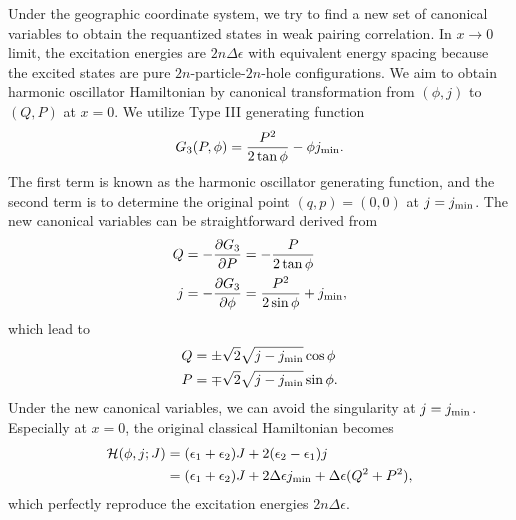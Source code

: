 \documentclass[11pt]{book} %
\begin{document}
Under the geographic coordinate system, we try to find a new set of canonical variables to obtain the requantized states in weak pairing correlation. 
In $x\to 0$ limit, the excitation energies are $2n\Delta\epsilon$ with equivalent energy spacing because the excited states are pure $2n$-particle-$2n$-hole 
configurations. 
We aim to obtain harmonic oscillator Hamiltonian by canonical transformation 
from $(\phi,j)$ to $(Q,P)$ at $x=0$. We utilize Type III generating function
\begin{align}
G_3(P,\phi) = \frac{P^2}{2\tan{\phi}} - \phi j_{\rm min} .
\end{align}
The first term is known as the harmonic oscillator generating function, 
and the second term is to determine the original point $(q,p)=(0,0)$ at $j=j_{\rm min}$. 
The new canonical variables can be straightforward derived from
\begin{align}
  Q &= -\frac{\partial G_3}{\partial P} = -\frac{P}{2\tan{\phi}} \\
  j &= -\frac{\partial G_3}{\partial \phi} = \frac{P^2}{2\sin{\phi}} + j_{\rm min},
\end{align}
which lead to
\begin{align}
  Q &= \pm \sqrt{2}\sqrt{j-j_{\rm min}} \cos{\phi} \\
  P &= \mp \sqrt{2}\sqrt{j-j_{\rm min}} \sin{\phi}.
\end{align}
Under the new canonical variables, 
we can avoid the singularity at $j=j_{\rm min}$.
Especially at $x=0$, the original classical Hamiltonian becomes
\begin{align}
  \mathcal{H}(\phi,j;J) &= (\epsilon_1+\epsilon_2)J + 2(\epsilon_2-\epsilon_1)j \nonumber \\
  	&= (\epsilon_1+\epsilon_2)J + 2\Delta\epsilon j_{\rm min}
	+ \Delta\epsilon(Q^2+P^2),
\end{align}
which perfectly reproduce the excitation energies $2n\Delta\epsilon$.


\end{document}
